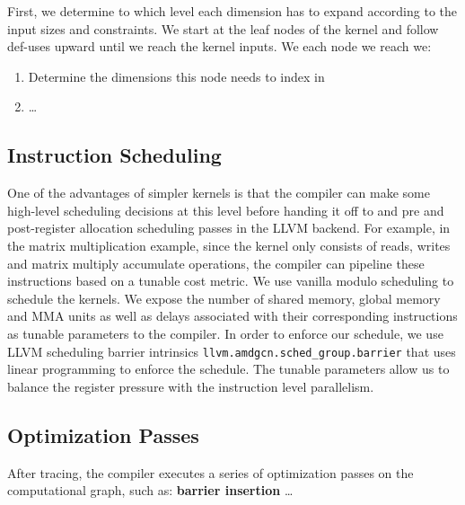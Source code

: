 \documentclass{article}
\begin{document}
First, we determine to which level each dimension has to expand according to the input sizes and constraints.
We start at the leaf nodes of the kernel and follow def-uses upward until we reach the kernel inputs. We each node we reach we:
\begin{enumerate}
    \item Determine the dimensions this node needs to index in
    \item \ldots
\end{enumerate}





\subsection{Instruction Scheduling}
One of the advantages of simpler kernels is that the compiler can make some high-level scheduling decisions at this level before
handing it off to and pre and post-register allocation scheduling passes in the LLVM backend. For example, in the matrix multiplication example,
since the kernel only consists of reads, writes and matrix multiply accumulate operations, the compiler can pipeline these instructions based on
a tunable cost metric. We use vanilla modulo scheduling \cite{dragonbook} to schedule the kernels. We expose the number of shared memory,
global memory and MMA units as well as delays associated with their corresponding instructions as tunable parameters to the compiler.
In order to enforce our schedule, we use LLVM scheduling barrier intrinsics \texttt{llvm.amdgcn.sched\_group.barrier} that uses linear programming
to enforce the schedule. The tunable parameters allow us to balance the register pressure with the instruction level parallelism.


\subsection{Optimization Passes}
After tracing, the compiler executes a series of optimization passes on the computational graph, such as:
\textbf{barrier insertion} %
\ldots
\end{document}
